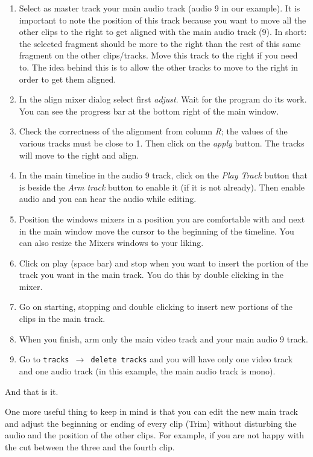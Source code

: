 \begin{enumerate}
	\item Select as master track your main audio track (audio 9 in our example). It is important to note the position of this track because you want to move all the other clips to the right to get aligned with the main audio track (9). In short: the selected fragment should be more to the right than the rest of this same fragment on the other clips/tracks. Move this track to the right if you need to. The idea behind this is to allow the other tracks to move to the right in order to get them aligned.
	\item In the align mixer dialog select first \textit{adjust}. Wait for the program do its work. You can see the progress bar at the bottom right of the main window.
	\item Check the correctness of the alignment from column \textit{R}; the values of the various tracks must be close to 1. Then click on the \textit{apply} button. The tracks will move to the right and align.
	\item In the main timeline in the audio 9 track, click on the \textit{Play Track} button that is beside the \textit{Arm track} button to enable it (if it is not already). Then enable audio and you can hear the audio while editing.
	\item Position the windows mixers in a position you are comfortable with and next in the main window move the cursor to the beginning of the timeline. You can also resize the Mixers windows to your liking.
	\item Click on play (space bar) and stop when you want to insert the portion of the track you want in the main track. You do this by double clicking in the mixer.
	\item Go on starting, stopping and double clicking to insert new portions of the clips in the main track.
	\item When you finish, arm only the main video track and your main audio 9 track.
	\item Go to \texttt{tracks $\rightarrow$ delete tracks} and you will have only one video track and one audio track (in this example, the main audio track is mono).
\end{enumerate}

And that is it.

One more useful thing to keep in mind is that you can edit the new main track and adjust the beginning or ending of every clip (Trim) without disturbing the audio and the position of the other clips.
For example, if you are not happy with the cut between the three and the fourth clip.

